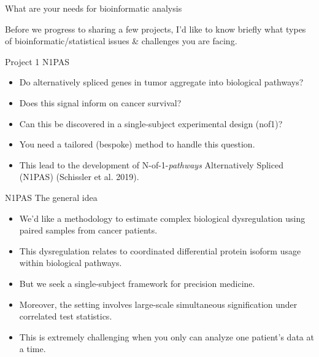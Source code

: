 \documentclass[ignorenonframetext,aspectratio=169,]{beamer}
\providecommand{\tightlist}{%
  \setlength{\itemsep}{0pt}\setlength{\parskip}{0pt}}
\begin{document}
\begin{frame}{%
\protect\hypertarget{what-are-your-needs-for-bioinformatic-analysis}{%
What are your needs for bioinformatic analysis}}

Before we progress to sharing a few projects, I’d like to know briefly
what types of bioinformatic/statistical issues \& challenges you are
facing.

\end{frame}

\begin{frame}{%
\protect\hypertarget{project-1-n1pas}{%
Project 1 N1PAS}}

\begin{itemize}
\tightlist
\item
  Do alternatively spliced genes in tumor aggregate into biological
  pathways?
\item
  Does this signal inform on cancer survival?
\item
  Can this be discovered in a single-subject experimental design (nof1)?
\item
  You need a tailored (bespoke) method to handle this question.
\item
  This lead to the development of N-of-1-\emph{pathways} Alternatively
  Spliced (N1PAS) (Schissler et al. 2019).
\end{itemize}

\end{frame}

\begin{frame}{%
\protect\hypertarget{n1pas-the-general-idea}{%
N1PAS The general idea}}

\begin{itemize}
\item We'd like a methodology to estimate complex biological dysregulation using paired samples from cancer patients.
\item This dysregulation relates to coordinated differential protein isoform usage within biological pathways.
\item But we seek a single-subject framework for precision medicine.
\item Moreover, the setting involves large-scale simultaneous signification under correlated test statistics.
  \item This is extremely challenging when you only can analyze one patient's data at a time.
\end{itemize}

\end{frame}
\end{document}
